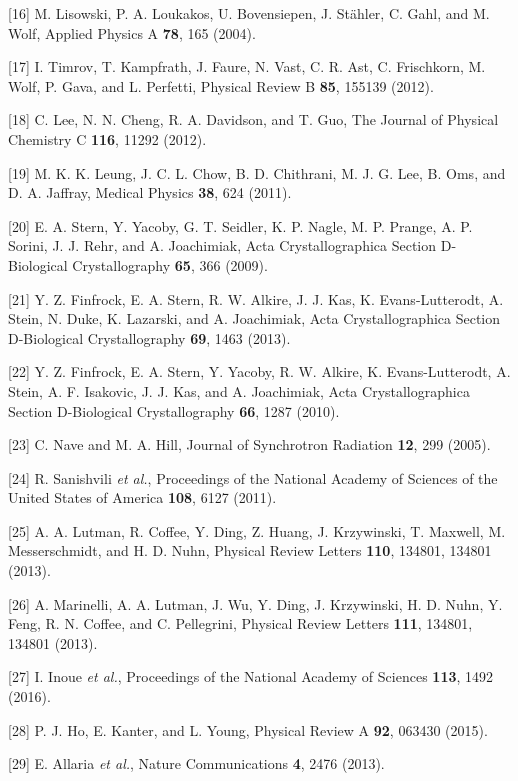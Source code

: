{[}16{]} M. Lisowski, P. A. Loukakos, U. Bovensiepen, J. Stähler, C.
Gahl, and M. Wolf, Applied Physics A \textbf{78}, 165 (2004).

{[}17{]} I. Timrov, T. Kampfrath, J. Faure, N. Vast, C. R. Ast, C.
Frischkorn, M. Wolf, P. Gava, and L. Perfetti, Physical Review B
\textbf{85}, 155139 (2012).

{[}18{]} C. Lee, N. N. Cheng, R. A. Davidson, and T. Guo, The Journal of
Physical Chemistry C \textbf{116}, 11292 (2012).

{[}19{]} M. K. K. Leung, J. C. L. Chow, B. D. Chithrani, M. J. G. Lee,
B. Oms, and D. A. Jaffray, Medical Physics \textbf{38}, 624 (2011).

{[}20{]} E. A. Stern, Y. Yacoby, G. T. Seidler, K. P. Nagle, M. P.
Prange, A. P. Sorini, J. J. Rehr, and A. Joachimiak, Acta
Crystallographica Section D-Biological Crystallography \textbf{65}, 366
(2009).

{[}21{]} Y. Z. Finfrock, E. A. Stern, R. W. Alkire, J. J. Kas, K.
Evans-Lutterodt, A. Stein, N. Duke, K. Lazarski, and A. Joachimiak, Acta
Crystallographica Section D-Biological Crystallography \textbf{69}, 1463
(2013).

{[}22{]} Y. Z. Finfrock, E. A. Stern, Y. Yacoby, R. W. Alkire, K.
Evans-Lutterodt, A. Stein, A. F. Isakovic, J. J. Kas, and A. Joachimiak,
Acta Crystallographica Section D-Biological Crystallography \textbf{66},
1287 (2010).

{[}23{]} C. Nave and M. A. Hill, Journal of Synchrotron Radiation
\textbf{12}, 299 (2005).

{[}24{]} R. Sanishvili \emph{et al.}, Proceedings of the National
Academy of Sciences of the United States of America \textbf{108}, 6127
(2011).

{[}25{]} A. A. Lutman, R. Coffee, Y. Ding, Z. Huang, J. Krzywinski, T.
Maxwell, M. Messerschmidt, and H. D. Nuhn, Physical Review Letters
\textbf{110}, 134801, 134801 (2013).

{[}26{]} A. Marinelli, A. A. Lutman, J. Wu, Y. Ding, J. Krzywinski, H.
D. Nuhn, Y. Feng, R. N. Coffee, and C. Pellegrini, Physical Review
Letters \textbf{111}, 134801, 134801 (2013).

{[}27{]} I. Inoue \emph{et al.}, Proceedings of the National Academy of
Sciences \textbf{113}, 1492 (2016).

{[}28{]} P. J. Ho, E. Kanter, and L. Young, Physical Review A
\textbf{92}, 063430 (2015).

{[}29{]} E. Allaria \emph{et al.}, Nature Communications \textbf{4},
2476 (2013).


